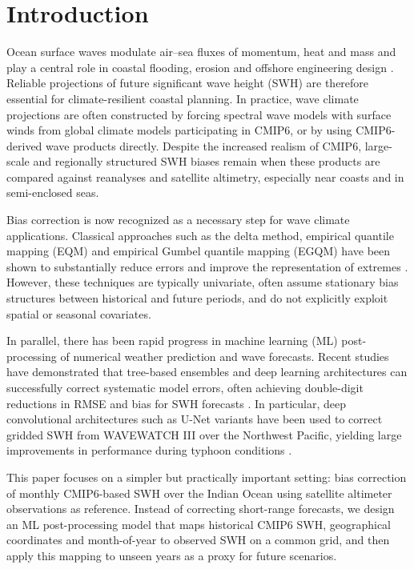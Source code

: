\documentclass[twocolumn]{article}
\begin{document}
\section{Introduction}

Ocean surface waves modulate air--sea fluxes of momentum, heat and mass and play a central role in coastal flooding, erosion and offshore engineering design \cite{lemos2020}. Reliable projections of future significant wave height (SWH) are therefore essential for climate-resilient coastal planning. In practice, wave climate projections are often constructed by forcing spectral wave models with surface winds from global climate models participating in CMIP6, or by using CMIP6-derived wave products directly. Despite the increased realism of CMIP6, large-scale and regionally structured SWH biases remain when these products are compared against reanalyses and satellite altimetry, especially near coasts and in semi-enclosed seas.

Bias correction is now recognized as a necessary step for wave climate applications. Classical approaches such as the delta method, empirical quantile mapping (EQM) and empirical Gumbel quantile mapping (EGQM) have been shown to substantially reduce errors and improve the representation of extremes \cite{lemos2020}. However, these techniques are typically univariate, often assume stationary bias structures between historical and future periods, and do not explicitly exploit spatial or seasonal covariates.

In parallel, there has been rapid progress in machine learning (ML) post-processing of numerical weather prediction and wave forecasts. Recent studies have demonstrated that tree-based ensembles and deep learning architectures can successfully correct systematic model errors, often achieving double-digit reductions in RMSE and bias for SWH forecasts \cite{sun2022}. In particular, deep convolutional architectures such as U-Net variants have been used to correct gridded SWH from WAVEWATCH III over the Northwest Pacific, yielding large improvements in performance during typhoon conditions \cite{sun2022}.

This paper focuses on a simpler but practically important setting: bias correction of monthly CMIP6-based SWH over the Indian Ocean using satellite altimeter observations as reference. Instead of correcting short-range forecasts, we design an ML post-processing model that maps historical CMIP6 SWH, geographical coordinates and month-of-year to observed SWH on a common grid, and then apply this mapping to unseen years as a proxy for future scenarios.
\end{document}
